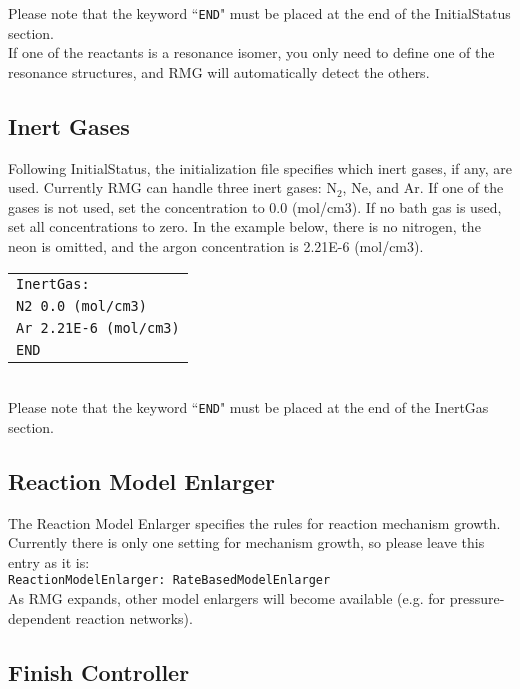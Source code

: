 \documentclass[12pt,letterpaper]{article}
\begin{document}
Please note that the keyword ``\texttt{END}" must be placed at the end of the
InitialStatus section.\\

If one of the reactants is a resonance isomer, you only need to define one
of the resonance structures, and RMG will automatically detect the others.

\subsection{Inert Gases}

Following InitialStatus, the initialization file specifies which inert gases, if any,
are used. Currently RMG can handle three inert gases: N$_2$, Ne, and Ar. If
one of the gases is not used, set the concentration to 0.0 (mol/cm3). If no
bath gas is used, set all concentrations to zero. In the example below, there
is no nitrogen, the neon is omitted, and the argon concentration is 2.21E-6
(mol/cm3).\\

\begin{tabular}{l}
\texttt{InertGas:} \\
\texttt{N2 0.0 (mol/cm3)}\\
\texttt{Ar 2.21E-6 (mol/cm3)} \\
\texttt{END}
\end{tabular}\\

Please note that the keyword ``\texttt{END}" must be placed at the end of the
InertGas section.
\subsection{Reaction Model Enlarger}

The Reaction Model Enlarger specifies the rules for reaction mechanism
growth. Currently there is only one setting for mechanism growth, so please
leave this entry as it is: \\

\texttt{ReactionModelEnlarger: RateBasedModelEnlarger} \\

As RMG expands, other model enlargers will become available (e.g. for
pressure-dependent reaction networks).

\subsection{Finish Controller}
\end{document}
